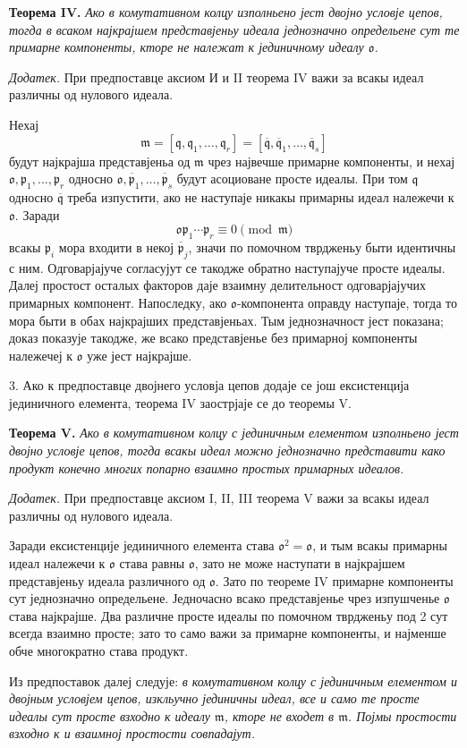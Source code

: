 \documentclass[11pt]{article}
\providecommand{\mm}{\mathfrak{m}}
\providecommand{\mo}{\mathfrak{o}}
\providecommand{\mq}{\mathfrak{q}}
\providecommand{\mpideal}{\mathfrak{p}}
\providecommand{\mbar}[1]{\overline{#1}}
\begin{document}
\textbf{Теорема IV.} \emph{Ако в комутативном колцу изполньено јест двојно условје цепов, тогда в всаком најкрајшем представјеньу идеала једнозначно определьене сут те примарне компоненты, кторе не належат к јединичному идеалу $\mo$.}

\emph{Додатек.} При предпоставце аксиом И и II теорема IV важи за всакы идеал различны од нулового идеала.

Нехај
\[
\mm=[\mq,\mq_1,\ldots,\mq_r]=[\mbar\mq,\mbar\mq_1,\ldots,\mbar\mq_s]
\]
будут најкрајша представјеньа од $\mm$ чрез највечше примарне компоненты, и нехај $\mo,\mpideal_1,\ldots,\mpideal_r$ односно $\mo,\mbar\mpideal_1,\ldots,\mbar\mpideal_s$ будут асоциоване просте идеалы. При том $\mq$ односно $\mbar\mq$ треба изпустити, ако не наступаје никакы примарны идеал належечи к $\mo$. Заради
\[
\mo\mpideal_1\cdots\mpideal_r\equiv0\pmod{\mm}
\]
всакы $\mpideal_i$ мора входити в некој $\mbar\mpideal_j$, значи по помочном тврдженьу быти идентичны с ним. Одговарјајуче согласујут се такодже обратно наступајуче просте идеалы. Далеј простост осталых факторов даје взаимну делительност одговарјајучих примарных компонент. Напоследку, ако $\mo$-компонента оправду наступаје, тогда то мора быти в обах најкрајших представјеньах. Тым једнозначност јест показана; доказ показује такодже, же всако представјенье без примарној компоненты належечеј к $\mo$ уже јест најкрајше.

3. Ако к предпоставце двојнего условја цепов додаје се још ексистенција јединичного елемента, теорема IV заострјаје се до теоремы V.

\textbf{Теорема V.} \emph{Ако в комутативном колцу с јединичным елементом изполньено јест двојно условје цепов, тогда всакы идеал можно једнозначно представити како продукт конечно многих попарно взаимно простых примарных идеалов.}

\emph{Додатек.} При предпоставце аксиом I, II, III теорема V важи за всакы идеал различны од нулового идеала.

Заради ексистенције јединичного елемента става $\mo^2=\mo$, и тым всакы примарны идеал належечи к $\mo$ става равны $\mo$, зато не може наступати в најкрајшем представјеньу идеала различного од $\mo$. Зато по теореме IV примарне компоненты сут једнозначно определьене. Једночасно всако представјенье чрез изпушченье $\mo$ става најкрајше. Два различне просте идеалы по помочном тврдженьу под 2 сут всегда взаимно просте; зато то само важи за примарне компоненты, и најменше обче многократно става продукт.

Из предпоставок далеј следује: \emph{в комутативном колцу с јединичным елементом и двојным условјем цепов, изкльучно јединичны идеал, все и само те просте идеалы сут просте взходно к идеалу $\mm$, кторе не входет в $\mm$. Појмы простости взходно к и взаимној простости совпадајут.}
\end{document}
